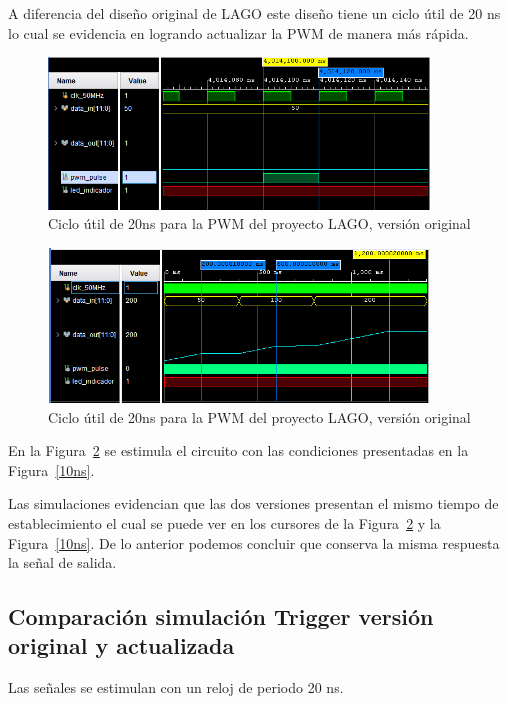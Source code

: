 A diferencia del diseño original de LAGO este diseño tiene un ciclo útil de 20 ns lo cual se evidencia en logrando actualizar la PWM de manera más rápida.

\begin{figure}[H]
\includegraphics[width=0.9\textwidth]{Figs/zomviejo.PNG} 
\centering
\caption{Ciclo útil de 20ns para la PWM del proyecto LAGO, versión original}
\label{ciclo10}
\end{figure}

\begin{figure}[H]
 \centering
 \includegraphics[width=0.9\textwidth]{Figs/Rampa_50MHz.PNG}
 \caption{Ciclo útil de 20ns para la PWM del proyecto LAGO, versión original}
 \label{ramapa50}
\end{figure}

En la Figura~\ref{ramapa50} se estimula el circuito con las condiciones presentadas en la Figura~\ref{10ns}.

Las simulaciones evidencian que las dos versiones presentan el mismo tiempo de establecimiento el cual se puede ver en los cursores de la Figura~\ref{ramapa50} y la Figura~\ref{10ns}. De lo anterior podemos concluir que conserva la misma respuesta la señal de salida.



\subsection{Comparación simulación Trigger versión original y actualizada}
Las señales se estimulan con un reloj de periodo 20 ns.

